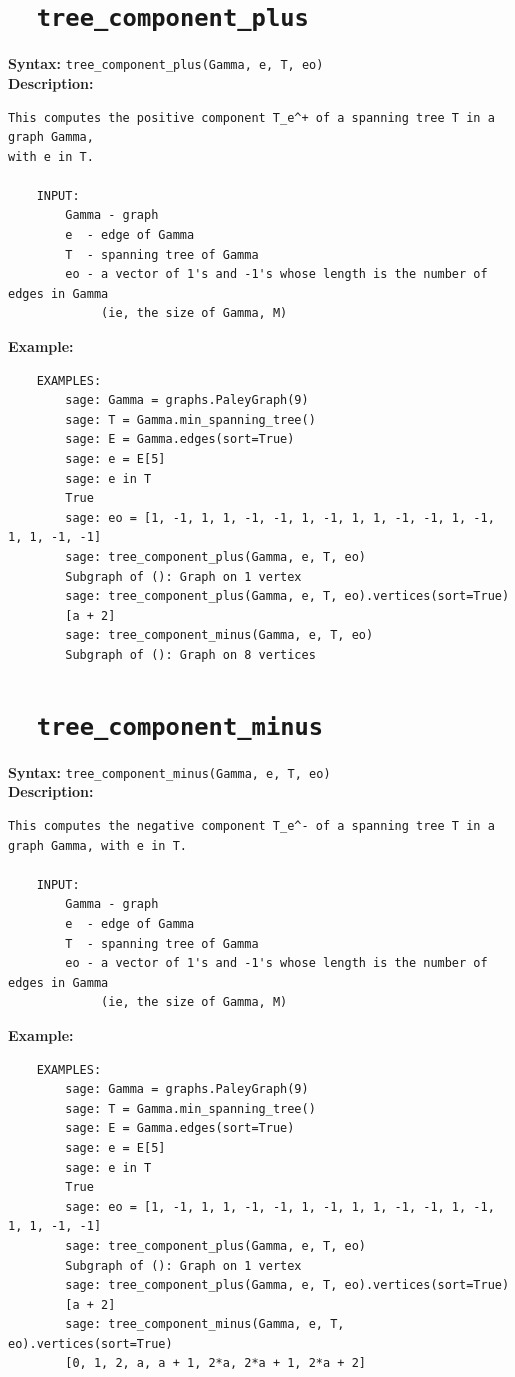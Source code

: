 \documentclass{article}
\begin{document}
\section{\tt \ \ tree\_component\_plus}

\textbf{Syntax:} \verb}tree_component_plus(Gamma, e, T, eo)}\\

\textbf{Description:}
\begin{verbatim}
This computes the positive component T_e^+ of a spanning tree T in a graph Gamma, 
with e in T.

    INPUT:
        Gamma - graph
        e  - edge of Gamma
        T  - spanning tree of Gamma  
        eo - a vector of 1's and -1's whose length is the number of edges in Gamma
             (ie, the size of Gamma, M)
\end{verbatim}
        
\textbf{Example:}
\begin{verbatim}
    EXAMPLES:
        sage: Gamma = graphs.PaleyGraph(9)
        sage: T = Gamma.min_spanning_tree()
        sage: E = Gamma.edges(sort=True)
        sage: e = E[5]
        sage: e in T
        True
        sage: eo = [1, -1, 1, 1, -1, -1, 1, -1, 1, 1, -1, -1, 1, -1, 1, 1, -1, -1]
        sage: tree_component_plus(Gamma, e, T, eo)
        Subgraph of (): Graph on 1 vertex
        sage: tree_component_plus(Gamma, e, T, eo).vertices(sort=True)
        [a + 2]
        sage: tree_component_minus(Gamma, e, T, eo)
        Subgraph of (): Graph on 8 vertices
\end{verbatim}

\section{\tt \ \ tree\_component\_minus}

\textbf{Syntax:} \verb}tree_component_minus(Gamma, e, T, eo)}\\

\textbf{Description:}
\begin{verbatim}
This computes the negative component T_e^- of a spanning tree T in a graph Gamma, with e in T.

    INPUT:
        Gamma - graph
        e  - edge of Gamma
        T  - spanning tree of Gamma  
        eo - a vector of 1's and -1's whose length is the number of edges in Gamma
             (ie, the size of Gamma, M)
\end{verbatim}
        
\textbf{Example:}
\begin{verbatim}
    EXAMPLES:
        sage: Gamma = graphs.PaleyGraph(9)
        sage: T = Gamma.min_spanning_tree()
        sage: E = Gamma.edges(sort=True)
        sage: e = E[5]
        sage: e in T
        True
        sage: eo = [1, -1, 1, 1, -1, -1, 1, -1, 1, 1, -1, -1, 1, -1, 1, 1, -1, -1]
        sage: tree_component_plus(Gamma, e, T, eo)
        Subgraph of (): Graph on 1 vertex
        sage: tree_component_plus(Gamma, e, T, eo).vertices(sort=True)
        [a + 2]
        sage: tree_component_minus(Gamma, e, T, eo).vertices(sort=True)
        [0, 1, 2, a, a + 1, 2*a, 2*a + 1, 2*a + 2]
\end{verbatim}
\end{document}
